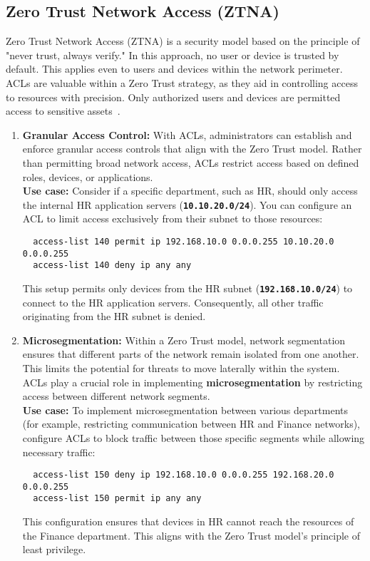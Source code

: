 \documentclass[11pt,a4paper]{article}
\begin{document}
    \subsection*{Zero Trust Network Access (ZTNA)}
    Zero Trust Network Access (ZTNA) is a security model based on the principle of "never trust, always verify." In this approach, no user or device is trusted by default. This applies even to users and devices within the network perimeter. ACLs are valuable within a Zero Trust strategy, as they aid in controlling access to resources with precision. Only authorized users and devices are permitted access to sensitive assets~\cite{ZTNA}.

    \begin{enumerate}
        \item \textbf{Granular Access Control:} With ACLs, administrators can establish and enforce granular access controls that align with the Zero Trust model. Rather than permitting broad network access, ACLs restrict access based on defined roles, devices, or applications.
        \\[1em]
        \textbf{Use case:} Consider if a specific department, such as HR, should only access the internal HR application servers (\textbf{\lstinline{10.10.20.0/24}}). You can configure an ACL to limit access exclusively from their subnet to those resources:
\begin{lstlisting}
  access-list 140 permit ip 192.168.10.0 0.0.0.255 10.10.20.0 0.0.0.255
  access-list 140 deny ip any any                                                       
\end{lstlisting}
        This setup permits only devices from the HR subnet (\textbf{\lstinline{192.168.10.0/24}}) to connect to the HR application servers. Consequently, all other traffic originating from the HR subnet is denied.


        \item \textbf{Microsegmentation:} Within a Zero Trust model, network segmentation ensures that different parts of the network remain isolated from one another. This limits the potential for threats to move laterally within the system. ACLs play a crucial role in implementing \textbf{microsegmentation} by restricting access between different network segments.
        \\[1em]
        \textbf{Use case:} To implement microsegmentation between various departments (for example, restricting communication between HR and Finance networks), configure ACLs to block traffic between those specific segments while allowing necessary traffic:
\begin{lstlisting}
  access-list 150 deny ip 192.168.10.0 0.0.0.255 192.168.20.0 0.0.0.255
  access-list 150 permit ip any any                                
\end{lstlisting}
        This configuration ensures that devices in HR cannot reach the resources of the Finance department. This aligns with the Zero Trust model's principle of least privilege.

    \end{enumerate}
\end{document}

